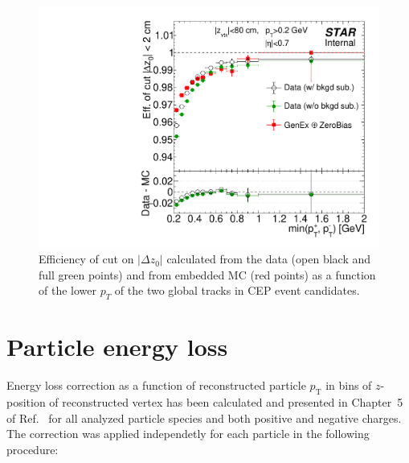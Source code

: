 \begin{figure}[ht!]
	\centering%
	\parbox{0.4725\textwidth}{%
		\centering%
		\includegraphics[width=\linewidth]{graphics/corrections/DeltaZ0Efficiency_2.pdf}
	}%
	\quad%
	\parbox{0.4725\textwidth}{%
		\caption[Efficiency of limit $|\Delta z_{0}|<2~\text{cm}$.]{Efficiency of cut on $|\Delta z_{0}|$ calculated from the data (open black and full green points) and from embedded MC (red points) as a function of the lower $p_{T}$ of the two global tracks in CEP event candidates.}\label{fig:DeltaZ0Eff}%
	}
\end{figure}
\newpage

\section{Particle energy loss}\label{sec:energyLoss}

Energy loss correction as a function of reconstructed particle $p_{\text{T}}$ in bins of $z$-position of reconstructed vertex has been calculated and presented in Chapter~5 of Ref.~\cite{supplementaryNote} for all analyzed particle species and both positive and negative charges. The correction was applied independetly for each particle in the following procedure:

